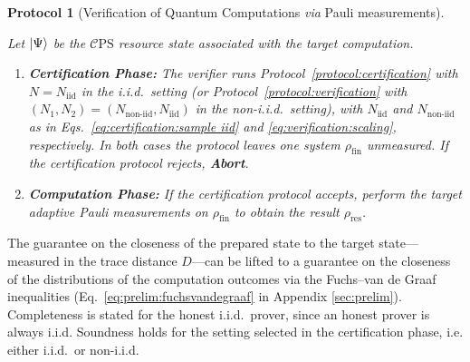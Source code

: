\documentclass[a4paper,twocolumn,11pt,unpublished]{quantumarticle}
\newtheorem{protocol}{Protocol}
\newcommand{\Niid}{N_{\mathrm{iid}}}
\newcommand{\Nnoniid}{N_{\mathrm{non\text{-}iid}}}
\newcommand{\mCEPS}{\mathcal{C}\text{PS}}
\begin{document}
\begin{protocol}[Verification of Quantum Computations \textit{via} Pauli measurements]
    \label{protocol:verification of UQC}

    Let $\ket\Psi$ be the $\mCEPS$ resource state associated with the target computation.

    \begin{enumerate}

        \item \textbf{Certification Phase:}
        The verifier runs Protocol~\ref{protocol:certification} with $N = \Niid$ in the i.i.d.\ setting (or Protocol~\ref{protocol:verification} with $(N_1,N_2) = (\Nnoniid,\Niid)$ in the non-i.i.d.\ setting), with $\Niid$ and $\Nnoniid$ as in Eqs.~\eqref{eq:certification:sample iid} and \eqref{eq:verification:scaling}, respectively. In both cases the protocol leaves one system $\rho_{\mathrm{fin}}$ unmeasured. If the certification protocol rejects, \textbf{Abort}.

        \item \textbf{Computation Phase:}
        If the certification protocol accepts, perform the target adaptive Pauli measurements on $\rho_{\mathrm{fin}}$ to obtain the result $\rho_{\mathrm{res}}$.

    \end{enumerate}
\end{protocol}

The guarantee on the closeness of the prepared state to the target state—measured in the trace distance $D$—can be lifted to a guarantee on the closeness of the distributions of the computation outcomes via the Fuchs--van de Graaf inequalities (Eq.~\eqref{eq:prelim:fuchsvandegraaf} in Appendix \ref{sec:prelim}).
Completeness is stated for the honest i.i.d.\ prover, since an honest prover is always i.i.d. Soundness holds for the setting selected in the certification phase, i.e. either i.i.d.\ or non-i.i.d.
\end{document}
